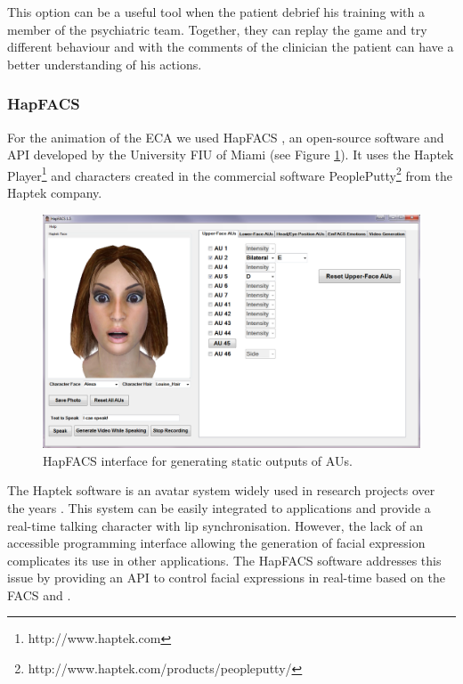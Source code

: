 \documentclass[11pt]{article}
\begin{document}
This option can be a useful tool when the patient debrief his training with a member of the psychiatric team. Together, they can replay the game and try different behaviour and with the comments of the clinician the patient can have a better understanding of his actions.						

\subsubsection{HapFACS}
For the animation of the ECA we used HapFACS \citep{Amini13}, an open-source software and API developed by the University FIU of Miami (see Figure \ref{Figure hapfacs API}). It uses the Haptek Player\footnote{http://www.haptek.com} and characters created in the commercial software PeoplePutty\footnote{http://www.haptek.com/products/peopleputty/} from the Haptek company.\\
\begin{figure}[!h]
   	\centerline{\includegraphics[scale=0.4]{./images/hapfacsAPI}}
   	\caption{\label{Figure hapfacs API} HapFACS interface for generating static outputs of AUs. \citep{Amini13}}
\end{figure}

The Haptek software is an avatar system widely used in research projects over the years \citep{Smith11, Fellner12, Lisetti13}. This system can be easily integrated to applications and provide a real-time talking character with lip synchronisation. However, the lack of an accessible programming interface allowing the generation of facial expression complicates its use in other applications. The HapFACS software addresses this issue by providing an API to control facial expressions in real-time based on the FACS and . \\
\end{document}
